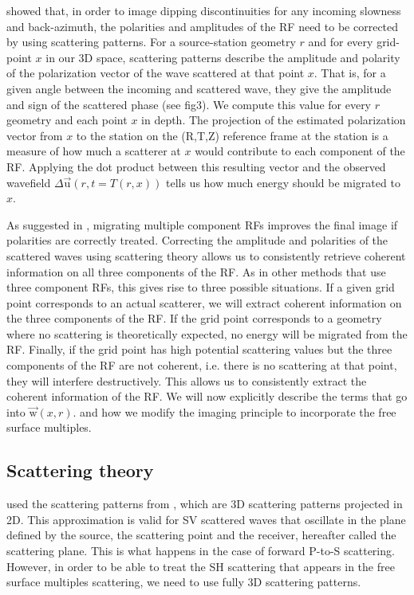 \documentclass[10pt,a4paper]{article}
\numberwithin{equation}{section}
\begin{document}
\cite{cheng_gji_16} showed that, in order to image dipping discontinuities for any incoming slowness and back-azimuth, the polarities and amplitudes of the RF need to be corrected by using scattering patterns.
 For a source-station geometry $r$ and for every grid-point $x$ in our 3D space, scattering patterns describe the amplitude and polarity of the polarization vector of the wave scattered at that point $x$.
That is, for a given angle between the incoming and scattered wave, they give the amplitude and sign of the scattered phase (see fig3).
 We compute this value for every $r$ geometry and each point $x$ in depth.
The projection of the estimated polarization vector from $x$ to the station on the (R,T,Z) reference frame at the station is a measure of how much a scatterer at $x$ would contribute to each component of the RF.
Applying the dot product between this resulting vector and the observed wavefield $\Delta\vec{\text{u}}(r,t=T(r,x))$  tells us how much energy should be migrated to $x$.

As suggested in \cite{tone_epsl_08}, migrating multiple component RFs improves the final image if polarities are correctly treated.
Correcting the amplitude and polarities of the scattered waves using scattering theory allows us to consistently retrieve coherent information on all three components of the RF.
As in other methods that use three component RFs, this gives rise to three possible situations.
If a given grid point corresponds to an actual scatterer, we will extract coherent information on the three components of the RF.
If the grid point corresponds to a geometry where no scattering is theoretically expected, no energy will be migrated from the RF.
Finally, if the grid point has high potential scattering values but the three components of the RF are not coherent, i.e. there is no scattering at that point, they will interfere destructively.
This allows us to consistently extract the coherent information of the RF. 
We will now explicitly describe the terms that go into $\vec{\text{w}}(x,r)$. and how we modify the imaging principle to incorporate the free surface multiples.

\subsection{Scattering theory}

\cite{cheng_gji_16} used the scattering patterns from \cite{rond_sgeo_09}, which are 3D scattering patterns projected in 2D.
This approximation is valid for SV scattered waves that oscillate in the plane defined by the source, the scattering point and the receiver, hereafter called the scattering plane.
This is what happens in the case of forward P-to-S scattering.
However, in order to be able to treat the SH scattering that appears in the free surface multiples scattering, we need to use fully 3D scattering patterns. 
\end{document}
